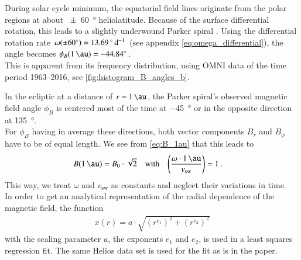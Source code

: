 During solar cycle minimum, the equatorial field lines originate from the polar regions at about \SI{+-60}{\degree} heliolatitude. Because of the surface differential rotation, this leads to a slightly underwound Parker spiral \citep{Banaszkiewicz1998}. Using the differential rotation rate $\omega(\SI{+-60}{\degree}) = \SI{13.69}{\degree\per\day}$ (see appendix \autoref{eq:omega_differential}), the angle becomes $\phi_B(\SI{1}{\au}) = \SI{-44.84}{\degree}$.\\

This is apparent from its frequency distribution, using OMNI data of the time period 1963--2016, see \autoref{fig:histogram_B_angles_b}.\\
\begin{figure}[htb]
\end{figure}

In the ecliptic at a distance of $r = \SI{1}{\au}$, the Parker spiral's observed magnetic field angle $\phi_B$ is centered most of the time at \SI{-45}{\degree} or in the opposite direction at \SI{135}{\degree}.\\

For $\phi_B$ having in average these directions, both vector components $B_r$ and $B_\phi$ have to be of equal length. We see from \autoref{eq:B_1au} that this leads to
\begin{align}
	B(\SI{1}{\au}) &= B_0 \cdot \sqrt{2}	&\text{with}	&	&	\left(\frac{\omega\cdot\SI{1}{\au}}{v_\text{sw}}\right) &= 1\,.
\end{align}
This way, we treat $\omega$ and $v_\text{sw}$ as constants and neglect their variations in time.\\

In order to get an analytical representation of the radial dependence of the magnetic field, the function
\begin{align}
	x(r) = a \cdot \sqrt{\left(r^{e_1}\right)^2 + \left(r^{e_2}\right)^2}	\label{eq:sqare_power_law}
\end{align}
with the scaling parameter $a$, the exponents $e_1$ and $e_2$, is used in a least squares regression fit. The same Helios data set is used for the fit as is in the paper.

